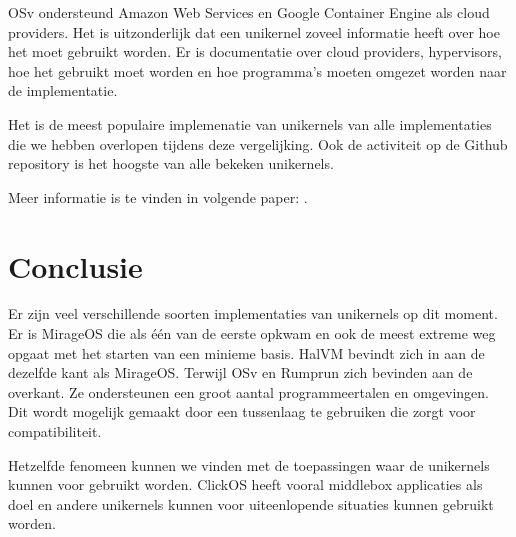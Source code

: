 OSv ondersteund Amazon Web Services en Google Container Engine als cloud providers. Het is uitzonderlijk dat een unikernel zoveel informatie heeft over hoe het moet gebruikt worden. Er is documentatie over cloud providers, hypervisors, hoe het gebruikt moet worden en hoe programma's moeten omgezet worden naar de implementatie.

Het is de meest populaire implemenatie van unikernels van alle implementaties die we hebben overlopen tijdens deze vergelijking. Ook de activiteit op de Github repository is het hoogste van alle bekeken unikernels.

Meer informatie is te vinden in volgende paper: \cite{kivity_osvoptimizing_2014}.

\section{Conclusie}

Er zijn veel verschillende soorten implementaties van unikernels op dit moment. Er is MirageOS die als één van de eerste opkwam en ook de meest extreme weg opgaat met het starten van een minieme basis. HalVM bevindt zich in aan de dezelfde kant als MirageOS. Terwijl OSv en Rumprun zich bevinden aan de overkant. Ze ondersteunen een groot aantal programmeertalen en omgevingen. Dit wordt mogelijk gemaakt door een tussenlaag te gebruiken die zorgt voor compatibiliteit. 

Hetzelfde fenomeen kunnen we vinden met de toepassingen waar de unikernels kunnen voor gebruikt worden. ClickOS heeft vooral middlebox applicaties als doel en andere unikernels kunnen voor uiteenlopende situaties kunnen gebruikt worden.